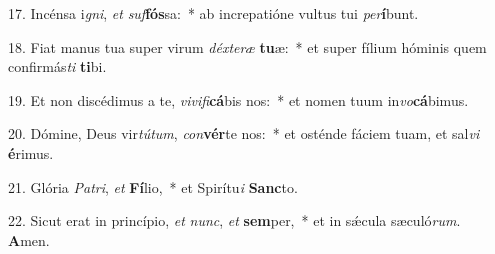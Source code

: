 17. Incénsa i\textit{gni}, \textit{et} \textit{suf}\textbf{fós}sa:~*  ab increpatióne vultus tui \textit{per}\textbf{í}bunt.\

18. Fiat manus tua super virum \textit{déx}\textit{te}\textit{ræ} \textbf{tu}æ:~*  et super fílium hóminis quem confirmás\textit{ti} \textbf{ti}bi.\

19. Et non discédimus a te, \textit{vi}\textit{vi}\textit{fi}\textbf{cá}bis nos:~*  et nomen tuum in\textit{vo}\textbf{cá}bimus.\

20. Dómine, Deus vir\textit{tú}\textit{tum}, \textit{con}\textbf{vér}te nos:~*  et osténde fáciem tuam, et sal\textit{vi} \textbf{é}rimus.\

21. Glória \textit{Pa}\textit{tri}, \textit{et} \textbf{Fí}lio,~*  et Spirítu\textit{i} \textbf{Sanc}to.\

22. Sicut erat in princípio, \textit{et} \textit{nunc}, \textit{et} \textbf{sem}per,~*  et in sǽcula sæculó\textit{rum}. \textbf{A}men.\

